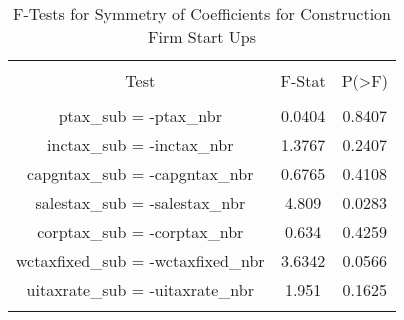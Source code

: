 
\begin{table}[!htbp] \centering 
  \caption{F-Tests for Symmetry of Coefficients for Construction Firm Start Ups} 
  \label{23Ftests} 
\begin{tabular}{@{\extracolsep{5pt}} ccc} 
\\[-1.8ex]\hline 
\hline \\[-1.8ex] 
Test & F-Stat & P(\textgreater F) \\ 
\hline \\[-1.8ex] 
ptax\_sub = -ptax\_nbr & 0.0404 & 0.8407 \\ 
inctax\_sub = -inctax\_nbr & 1.3767 & 0.2407 \\ 
capgntax\_sub = -capgntax\_nbr & 0.6765 & 0.4108 \\ 
salestax\_sub = -salestax\_nbr & 4.809 & 0.0283 \\ 
corptax\_sub = -corptax\_nbr & 0.634 & 0.4259 \\ 
wctaxfixed\_sub = -wctaxfixed\_nbr & 3.6342 & 0.0566 \\ 
uitaxrate\_sub = -uitaxrate\_nbr & 1.951 & 0.1625 \\ 
\hline \\[-1.8ex] 
\end{tabular} 
\end{table} 
